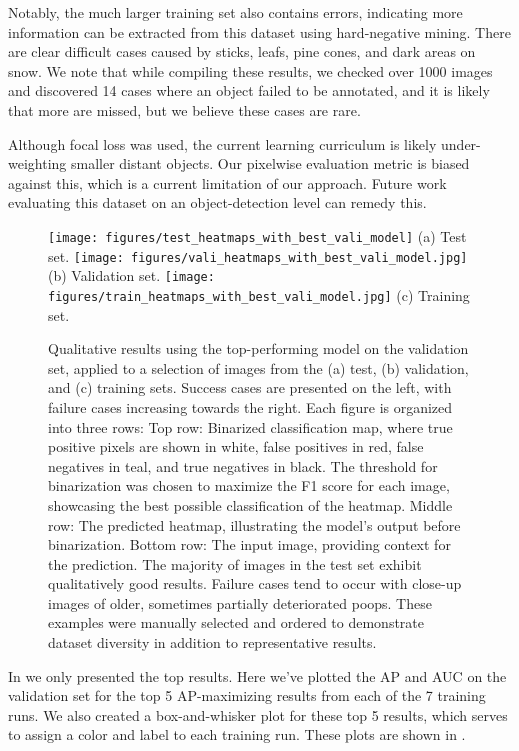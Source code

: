 Notably, the much larger training set also contains errors, indicating more information can be extracted
  from this dataset using hard-negative mining.
There are clear difficult cases caused by sticks, leafs, pine cones, and dark areas on snow.
We note that while compiling these results, we checked over 1000 images and discovered 14 cases where an
  object failed to be annotated, and it is likely that more are missed, but we believe these cases are rare.

Although focal loss was used, the current learning curriculum is likely under-weighting smaller distant
  objects.
Our pixelwise evaluation metric is biased against this, which is a current limitation of our approach.
Future work evaluating this dataset on an object-detection level can remedy this.

\begin{figure*}[ht]
\centering
\texttt{[image: figures/test\_heatmaps\_with\_best\_vali\_model]}%
\hfill
(a) Test set.
\texttt{[image: figures/vali\_heatmaps\_with\_best\_vali\_model.jpg]}%
\hfill
(b) Validation set.
\texttt{[image: figures/train\_heatmaps\_with\_best\_vali\_model.jpg]}%
\hfill
(c) Training set.
\caption[]{
    Qualitative results using the top-performing model on the validation set, applied to a selection of images
      from the (a) test, (b) validation, and (c) training sets.
    Success cases are presented on the left, with failure cases increasing towards the right.
    Each figure is organized into three rows:
    Top row:
    Binarized classification map, where true positive pixels are shown in white, false positives in red, false
      negatives in teal, and true negatives in black.
    The threshold for binarization was chosen to maximize the F1 score for each image, showcasing the best
      possible classification of the heatmap.
    Middle row:
    The predicted heatmap, illustrating the model's output before binarization.
    Bottom row:
    The input image, providing context for the prediction.
    The majority of images in the test set exhibit qualitatively good results.
    Failure cases tend to occur with close-up images of older, sometimes partially deteriorated poops.
    These examples were manually selected and ordered to demonstrate dataset
    diversity in addition to representative results.
}
\label{fig:test_heatmaps_with_best_vali_model}
\end{figure*}


In  we only presented the top results.
Here we've plotted the AP and AUC on the validation set for the top 5 AP-maximizing results from each of the
  7 training runs.
We also created a box-and-whisker plot for these top 5 results, which serves to assign a color and label to
  each training run.
These plots are shown in .



